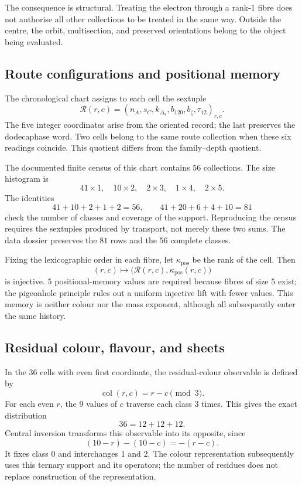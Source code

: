 The consequence is structural. Treating the electron through a
rank-\(1\) fibre does not authorise all other collections to be treated
in the same way. Outside the centre, the orbit, multisection, and preserved
orientations belong to the object being evaluated.

\subsection{Route configurations and positional memory}

The chronological chart assigns to each cell the sextuple
\[
 \mathcal R(r,c)=
 (n_A,s_C,k_{\Delta_4},b_{120},b_{\zeta},\tau_{12})_{r,c}.
\]
The five integer coordinates arise from the oriented record; the last
preserves the dodecaphase word. Two cells belong to the same route
collection when these six readings coincide. This quotient differs
from the family--depth quotient.

The documented finite census of this chart contains \(56\) collections.
The size histogram is
\[
 41\times1,\quad10\times2,\quad2\times3,\quad1\times4,\quad2\times5.
\]
The identities
\[
 41+10+2+1+2=56,\qquad
 41+20+6+4+10=81
\]
check the number of classes and coverage of the support. Reproducing
the census requires the sextuples produced by transport, not merely these
two sums. The data dossier preserves the \(81\) rows and the
\(56\) complete classes.

Fixing the lexicographic order in each fibre, let \(\kappa_{\mathrm{pos}}\)
be the rank of the cell. Then
\[
 (r,c)\longmapsto\bigl(\mathcal R(r,c),\kappa_{\mathrm{pos}}(r,c)\bigr)
\]
is injective. \(5\) positional-memory values are required because
fibres of size \(5\) exist; the pigeonhole principle rules out a
uniform injective lift with fewer values. This memory is neither colour
nor the mass exponent, although all subsequently enter the same history.

\subsection{Residual colour, flavour, and sheets}

In the \(36\) cells with even first coordinate, the residual-colour
observable is defined by
\[
 \operatorname{col}(r,c)=r-c\pmod3.
\]
For each even \(r\), the \(9\) values of \(c\) traverse each class
\(3\) times. This gives the exact distribution
\[
 36=12+12+12.
\]
Central inversion transforms this observable into its opposite, since
\[
 (10-r)-(10-c)=-(r-c).
\]
It fixes class \(0\) and interchanges \(1\) and \(2\). The colour
representation subsequently uses this ternary support and its operators;
the number of residues does not replace construction of the representation.

